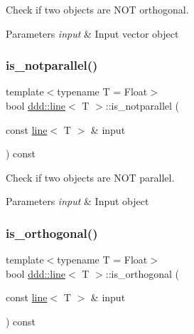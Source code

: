 Check if two objects are N\+OT orthogonal. 


\begin{DoxyParams}{Parameters}
{\em input} & Input vector object \\
\hline
\end{DoxyParams}
\mbox{\label{classddd_1_1line_a1cbafdf3998cbf4e154b272c29357124}} 
\subsubsection{\texorpdfstring{is\+\_\+notparallel()}{is\_notparallel()}}
{\footnotesize\ttfamily template$<$typename T = Float$>$ \\
bool \hyperlink{classddd_1_1line}{ddd\+::line}$<$ T $>$\+::is\+\_\+notparallel (\begin{DoxyParamCaption}\item[{const \hyperlink{classddd_1_1line}{line}$<$ T $>$ \&}]{input }\end{DoxyParamCaption}) const\hspace{0.3cm}{\ttfamily [inline]}}



Check if two objects are N\+OT parallel. 


\begin{DoxyParams}{Parameters}
{\em input} & Input object \\
\hline
\end{DoxyParams}
\mbox{\label{classddd_1_1line_a31170f8f74362954dc35ae189ba64984}} 
\subsubsection{\texorpdfstring{is\+\_\+orthogonal()}{is\_orthogonal()}}
{\footnotesize\ttfamily template$<$typename T = Float$>$ \\
bool \hyperlink{classddd_1_1line}{ddd\+::line}$<$ T $>$\+::is\+\_\+orthogonal (\begin{DoxyParamCaption}\item[{const \hyperlink{classddd_1_1line}{line}$<$ T $>$ \&}]{input }\end{DoxyParamCaption}) const\hspace{0.3cm}{\ttfamily [inline]}}



